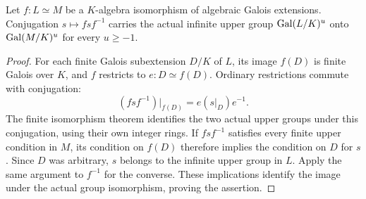 \begin{lemma}
\label{fw:infinite-upper-isomorphism}
\leanok
Let $f:L\simeq M$ be a $K$-algebra isomorphism of algebraic Galois
extensions. Conjugation $s\mapsto fsf^{-1}$ carries the actual infinite
upper group $\operatorname{Gal}(L/K)^u$ onto $\operatorname{Gal}(M/K)^u$ for every $u\geq-1$.
\end{lemma}
\begin{proof}
For each finite Galois subextension $D/K$ of $L$, its image $f(D)$ is
finite Galois over $K$, and $f$ restricts to $e:D\simeq f(D)$.
Ordinary restrictions commute with conjugation:
\[
 (fsf^{-1})|_{f(D)}=e(s|_D)e^{-1}.
\]
The finite isomorphism theorem identifies the two actual upper groups
under this conjugation, using their own integer rings. If $fsf^{-1}$
satisfies every finite upper condition in $M$, its condition on $f(D)$
therefore implies the condition on $D$ for $s$. Since $D$ was arbitrary,
$s$ belongs to the infinite upper group in $L$. Apply the same argument
to $f^{-1}$ for the converse. These implications identify the image
under the actual group isomorphism, proving the assertion.
\end{proof}

